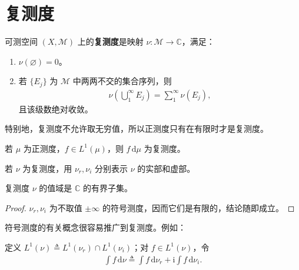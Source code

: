 \documentclass[../../main.tex]{subfiles}%
\begin{document}
\section{复测度}\label{section:ch03-complex-measures}
\begin{definition}[复测度]\label{definition:ch03-complex-measure}
可测空间 $(X,\mathscr{M})$ 上的\textbf{复测度}是映射 $\nu:\mathscr{M}\to\mathbb{C}$，满足：
\begin{enumerate}
\item $\nu(\varnothing)=0$。
\item 若 $\{E_j\}$ 为 $\mathscr{M}$ 中两两不交的集合序列，则
\begin{align*}
\nu\left(\bigcup_1^\infty E_j\right)=\sum_1^\infty\nu(E_j),
\end{align*}
且该级数绝对收敛。
\end{enumerate}
\end{definition}
\begin{remark}
特别地，复测度不允许取无穷值，所以正测度只有在有限时才是复测度。
\end{remark}
\begin{example}\label{example:ch03-complex-density}
若 $\mu$ 为正测度，$f\in L^1(\mu)$，则 $f\,\mathrm{d}\mu$ 为复测度。
\end{example}
\begin{definition}[复测度的实部与虚部]\label{definition:ch03-complex-real-imaginary}
若 $\nu$ 为复测度，用 $\nu_r,\nu_i$ 分别表示 $\nu$ 的实部和虚部。
\end{definition}
\begin{proposition}\label{proposition:ch03-complex-bounded-range}
复测度 $\nu$ 的值域是 $\mathbb{C}$ 的有界子集。
\end{proposition}
\begin{proof}
$\nu_r,\nu_i$ 为不取值 $\pm\infty$ 的符号测度，因而它们是有限的，结论随即成立。
\end{proof}
符号测度的有关概念很容易推广到复测度。例如：
\begin{definition}[关于复测度的积分]\label{definition:ch03-complex-integration}
定义 $L^1(\nu)\triangleq L^1(\nu_r)\cap L^1(\nu_i)$；对 $f\in L^1(\nu)$，令
\begin{align*}
\int f\,\mathrm{d}\nu\triangleq\int f\,\mathrm{d}\nu_r+\mathrm{i}\int f\,\mathrm{d}\nu_i.
\end{align*}
\end{definition}
\end{document}
